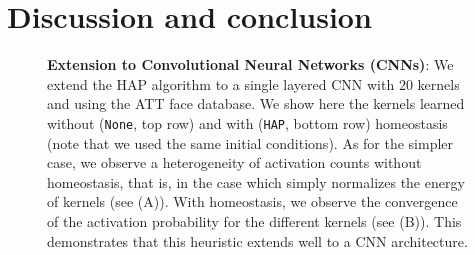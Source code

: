 \documentclass[letterpaper,final,conference,10pt]{IEEEtran}
\newcommand{\seeFig}[1]{Figure~\ref{fig:#1}}%
\begin{document}
\section{Discussion and conclusion}\label{discussion-et-conclusion}
\begin{figure}[!ht]%
\caption{
{\bf Extension to Convolutional Neural Networks (CNNs)}: %
 We extend the HAP algorithm to a single layered CNN with $20$ kernels and using the ATT face database. We show here the kernels learned without (\texttt{None}, top row) and with (\texttt{HAP}, bottom row) homeostasis (note that we used the same initial conditions). As for the simpler case, we observe a heterogeneity of activation counts without homeostasis, that is, in the case which simply normalizes the energy of kernels (see {\sf (A)}). With homeostasis, we observe the convergence of the activation probability for the different kernels (see {\sf (B)}). This demonstrates that this heuristic extends well to a CNN architecture.
\label{fig:CNN}}%
\end{figure}%
\end{document}
